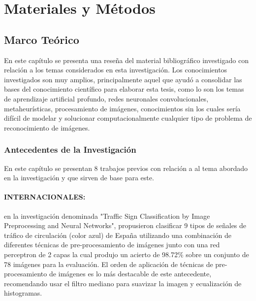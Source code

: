 \chapter{Materiales y Métodos}
\setcounter{page}{11}
\renewcommand{\baselinestretch}{1.2} %

\section{Marco Teórico} 

En este capítulo se presenta una reseña del material bibliográfico investigado con relación a los temas considerados en esta investigación. Los conocimientos investigados son muy amplios, principalmente aquel que ayudó a consolidar las bases del conocimiento científico para elaborar esta tesis, como lo son los temas de aprendizaje artificial profundo, redes neuronales convolucionales, metaheurísticas, procesamiento de imágenes, conocimientos sin los cuales sería difícil de modelar y solucionar computacionalmente cualquier tipo de problema de reconocimiento de imágenes.

\subsection{Antecedentes de la Investigación}

	En este capítulo se presentan 8 trabajos previos con relación a al tema abordado en la investigación y que sirven de base para este.
	\vskip 0.4cm

	\subsubsection
	{INTERNACIONALES:}
		\citep{VicenBueno2007} en la investigación denominada "Traffic Sign Classification by Image Preprocessing and Neural Networks", propusieron clasificar 9 tipos de señales de tráfico de circulación (color azul) de España utilizando una combinación de diferentes técnicas de pre-procesamiento de imágenes junto con una red perceptron de 2 capas la cual produjo un acierto de 98.72\% sobre un conjunto de 78 imágenes para la evaluación. El orden de aplicación de técnicas de pre-procesamiento de imágenes es lo más destacable de este antecedente, recomendando usar el filtro mediano para suavizar la imagen y ecualización de histogramas.
		\vskip 0.4cm

